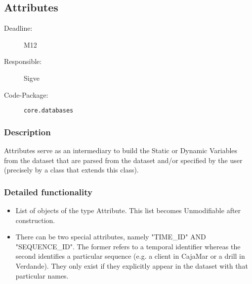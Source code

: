 \subsection{Attributes}
\label{Attributes:ID}

\begin{description}
\item[Deadline:] M12
\item[Responsible:] Sigve
\item[Code-Package:] \texttt{core.databases}
\end{description}

\subsubsection*{Description}

Attributes serve as an intermediary to build the Static or Dynamic Variables from the dataset that are parsed from the dataset and/or specified by the user (precisely by a class that extends this class). 

\subsubsection*{Detailed functionality}

\begin{itemize}
\item List of objects of the type Attribute. This list becomes Unmodifiable after construction.
\item There can be two special attributes, namely "TIME\_ID" AND "SEQUENCE\_ID". The former refers to a temporal identifier whereas the second identifies a particular sequence (e.g. a client in CajaMar or a drill in Verdande). They only exist if they explicitly appear in the dataset with that particular names.
\end{itemize}